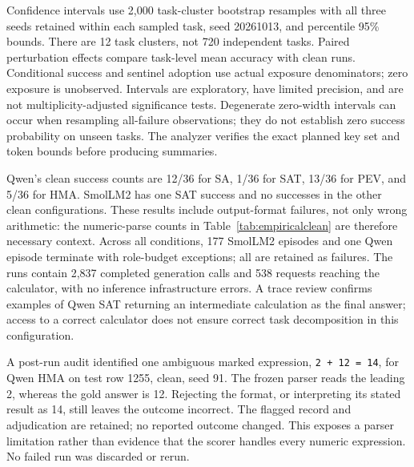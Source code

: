 \documentclass[11pt]{article}
\begin{document}
Confidence intervals use 2,000 task-cluster bootstrap resamples with all three seeds retained within each sampled task, seed 20261013, and percentile 95\% bounds. There are 12 task clusters, not 720 independent tasks. Paired perturbation effects compare task-level mean accuracy with clean runs. Conditional success and sentinel adoption use actual exposure denominators; zero exposure is unobserved. Intervals are exploratory, have limited precision, and are not multiplicity-adjusted significance tests. Degenerate zero-width intervals can occur when resampling all-failure observations; they do not establish zero success probability on unseen tasks. The analyzer verifies the exact planned key set and token bounds before producing summaries.

\begin{table}[htbp]\centering\small
\caption{Observed clean-condition results, 36 attempts per row. Parsed counts nonmissing numeric parses under the frozen parser. Intervals concern accuracy; tokens and seconds are episode medians.}\label{tab:empiricalclean}

\end{table}

Qwen's clean success counts are 12/36 for SA, 1/36 for SAT, 13/36 for PEV, and 5/36 for HMA. SmolLM2 has one SAT success and no successes in the other clean configurations. These results include output-format failures, not only wrong arithmetic: the numeric-parse counts in Table~\ref{tab:empiricalclean} are therefore necessary context. Across all conditions, 177 SmolLM2 episodes and one Qwen episode terminate with role-budget exceptions; all are retained as failures. The runs contain 2,837 completed generation calls and 538 requests reaching the calculator, with no inference infrastructure errors. A trace review confirms examples of Qwen SAT returning an intermediate calculation as the final answer; access to a correct calculator does not ensure correct task decomposition in this configuration.

A post-run audit identified one ambiguous marked expression, \texttt{2 + 12 = 14}, for Qwen HMA on test row 1255, clean, seed 91. The frozen parser reads the leading 2, whereas the gold answer is 12. Rejecting the format, or interpreting its stated result as 14, still leaves the outcome incorrect. The flagged record and adjudication are retained; no reported outcome changed. This exposes a parser limitation rather than evidence that the scorer handles every numeric expression. No failed run was discarded or rerun.
\end{document}
